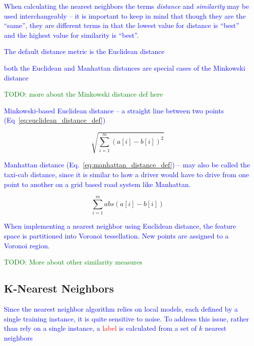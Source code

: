 \textcolor{blue}{When calculating the nearest neighbors the terms \textit{distance} and \textit{similarity} may be used interchangeably -- it is important to keep in mind that though they are the ``same'', they are different terms in that the lowest value for distance is ``best'' and the highest value for similarity is ``best''.}

\textcolor{blue}{The default distance metric is the Euclidean distance}

\textcolor{blue}{both the Euclidean and Manhattan distances are special cases of the Minkowski distance}

\textcolor{green}{TODO: more about the Minkowski distance def here}

\textcolor{blue}{Minkowski-based Euclidean distance -- a straight line between two points (Eq~\ref{eq:euclidean_distance_def})}

\begin{equation}
{\sqrt{\sum_{i=1}^{m}{{(a[i] - b[i])}^2}}}
\label{eq:euclidean_distance_def}
\end{equation}

\textcolor{blue}{Manhattan distance (Eq.~\ref{eq:manhattan_distance_def}) -- may also be called the taxi-cab distance, since it is similar to how a driver would have to drive from one point to another on a grid based road system like Manhattan.}

\begin{equation}
{\sum_{i=1}^{m}{abs(a[i] - b[i])}}
\label{eq:manhattan_distance_def}
\end{equation}

\textcolor{blue}{When implementing a nearest neighbor using Euclidean distance, the feature space is partitioned into {Voronoi tessellation}. New points are assigned to a {Voronoi region}.}

\textcolor{green}{TODO: More about other similarity measures}

\subsection{K-Nearest Neighbors}

\textcolor{blue}{Since the nearest neighbor algorithm relies on local models, each defined by a single training instance, it is quite sensitive to noise. To address this issue, rather than rely on a single instance, a \textcolor{red}{label} is calculated from a set of $k$ nearest neighbors}

